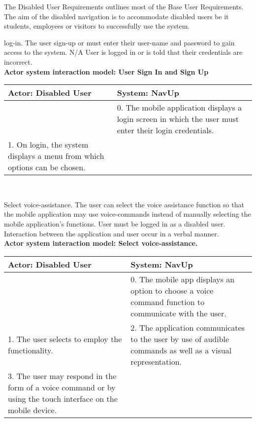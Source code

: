The Disabled User Requirements outlines most of the Base User Requirements. The aim of the disabled navigation is to accommodate disabled users be it students, employees or visitors to successfully use the system.

\FuncReq 
{log-in.}
{The user sign-up or must enter their user-name and password to gain access to the system.}
{N/A}
{User is logged in or is told that their credentials are incorrect.}
     \\
    \textbf{Actor system interaction model: User Sign In and Sign Up }\\
    \begin{tabular}{ | p{6cm} | p{6cm} |}
    \hline
    Actor: Disabled User & System: NavUp \\ \hline
     & 0. The mobile application displays a login screen in which the user must enter their login credentials.\\ \hline
    1. On login, the system displays a menu from which options can be chosen. &\\ \hline   
    \end{tabular}
\\
\bigskip

\FuncReq
{Select voice-assistance.}
{The user can select the voice assistance function so that the mobile application may use voice-commands instead of manually selecting the mobile application's functions.}
{User must be logged in as a disabled user.}
{Interaction between the application and user occur in a verbal manner.}
    \\
    \textbf{Actor system interaction model: Select voice-assistance.}\\
    \begin{tabular}{ | p{6cm} | p{6cm} |}
    \hline
    Actor: Disabled User & System: NavUp \\ \hline
     & 0. The mobile app displays an option to choose a voice command function to communicate with the user.\\ \hline
    1. The user selects to employ the functionality. & 2. The application communicates to the user by use of audible commands as well as a visual representation.\\ \hline
    3. The user may respond in the form of a voice command or by using the touch interface on the mobile device. & \\ \hline
    
    \end{tabular}
\\
\bigskip

